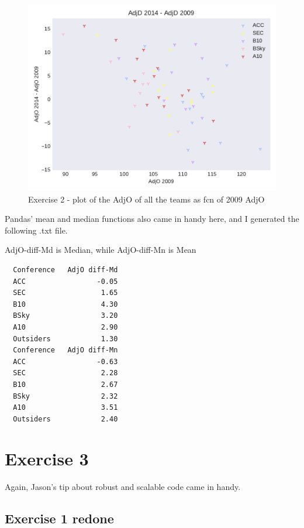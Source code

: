 \documentclass[a4paper,11pt]{article}
\begin{document}
\begin{figure}[ht!]
  \includegraphics[width=\linewidth]{../plots/Exc2.pdf}
  \caption{Exercise 2 - plot of the AdjO of all the teams as fcn of 2009 AdjO}
  \label{exc2}
\end{figure}

Pandas' mean and median functions also came in handy here, and I generated the following .txt file.

AdjO-diff-Md is Median, while AdjO-diff-Mn is Mean

\begin{verbatim}
  Conference   AdjO diff-Md
  ACC                 -0.05
  SEC                  1.65
  B10                  4.30
  BSky                 3.20
  A10                  2.90
  Outsiders            1.30
  Conference   AdjO diff-Mn
  ACC                 -0.63
  SEC                  2.28
  B10                  2.67
  BSky                 2.32
  A10                  3.51
  Outsiders            2.40
\end{verbatim}






\section{Exercise 3}

Again, Jason's tip about robust and scalable code came in handy.

\subsection{Exercise 1 redone}
\end{document}
